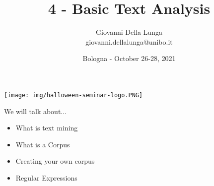 \documentclass[11pt]{beamer}
\author{Giovanni Della Lunga\\{\footnotesize giovanni.dellalunga@unibo.it}}
\title{4 - Basic Text Analysis}
\subtitle{} %
\institute{Halloween Conference in Quantitative Finance}
\date{Bologna - October 26-28, 2021}
\begin{document}
\begin{frame}
\texttt{[image: img/halloween-seminar-logo.PNG]}
\end{frame}

\begin{frame}
\titlepage
\end{frame}

\AtBeginSubsection{\frame{\subsectionpage}}


\begin{frame}{We will talk about...}
\begin{itemize}
\item What is text mining
\item What is a Corpus
\item Creating your own corpus
\item Regular Expressions
\end{itemize}
\end{frame}
\end{document}

